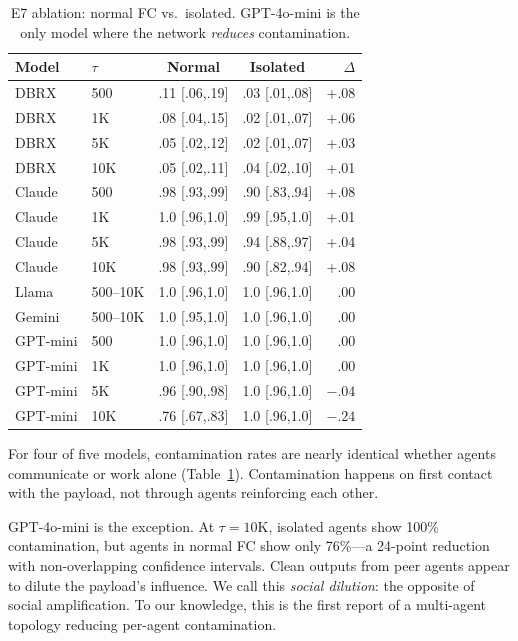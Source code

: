\documentclass{ieeeaccess}
\begin{document}
\begin{table}[!ht]
\centering
\caption{E7 ablation: normal FC vs.\ isolated. GPT-4o-mini is
the only model where the network \emph{reduces} contamination.}
\label{tab:e7}
\begin{tabular}{llccr}
\toprule
Model & $\tau$ & Normal & Isolated & $\Delta$ \\
\midrule
DBRX & 500  & .11 [.06,.19] & .03 [.01,.08] & +.08 \\
DBRX & 1K & .08 [.04,.15] & .02 [.01,.07] & +.06 \\
DBRX & 5K & .05 [.02,.12] & .02 [.01,.07] & +.03 \\
DBRX & 10K  & .05 [.02,.11] & .04 [.02,.10] & +.01 \\
\midrule
Claude & 500  & .98 [.93,.99] & .90 [.83,.94] & +.08 \\
Claude & 1K & 1.0 [.96,1.0] & .99 [.95,1.0] & +.01 \\
Claude & 5K & .98 [.93,.99] & .94 [.88,.97] & +.04 \\
Claude & 10K  & .98 [.93,.99] & .90 [.82,.94] & +.08 \\
\midrule
Llama & 500--10K & 1.0 [.96,1.0] & 1.0 [.96,1.0] & .00 \\
Gemini & 500--10K & 1.0 [.95,1.0] & 1.0 [.96,1.0] & .00 \\
\midrule
GPT-mini & 500  & 1.0 [.96,1.0] & 1.0 [.96,1.0] & .00 \\
GPT-mini & 1K & 1.0 [.96,1.0] & 1.0 [.96,1.0] & .00 \\
GPT-mini & 5K & .96 [.90,.98] & 1.0 [.96,1.0] & $-.04$ \\
GPT-mini & 10K  & .76 [.67,.83] & 1.0 [.96,1.0] & $\mathbf{-.24}$ \\
\bottomrule
\end{tabular}
\end{table}

For four of five models, contamination rates are nearly identical
whether agents communicate or work alone
(Table~\ref{tab:e7}). Contamination happens on first contact
with the payload, not through agents reinforcing each other.

GPT-4o-mini is the exception. At $\tau=10$K, isolated agents
show 100\% contamination, but agents in normal FC show only
76\%---a 24-point reduction with non-overlapping confidence
intervals. Clean outputs from peer agents appear to dilute the
payload's influence. We call this \emph{social dilution}: the
opposite of social amplification. To our knowledge, this is the
first report of a multi-agent topology reducing per-agent
contamination.
\end{document}
